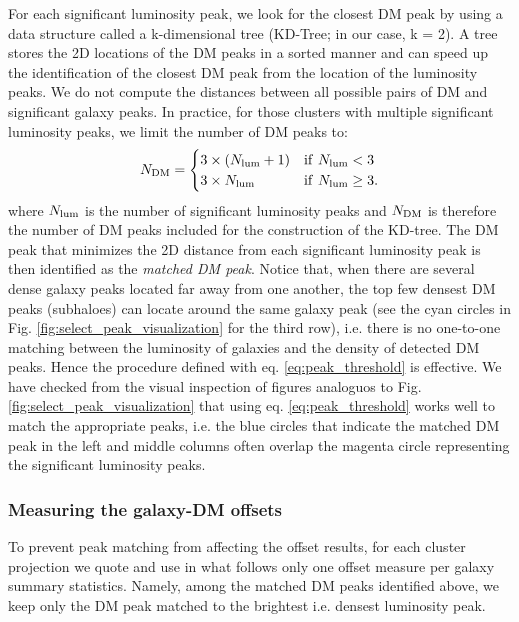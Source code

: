 \documentclass[usenatbib]{mn2e}
\begin{document}
{For each significant luminosity peak, we look for the closest DM peak by using a data structure called a k-dimensional tree (KD-Tree; in
our case, k = 2). A tree stores the 2D locations of the DM peaks in a sorted
manner and can speed up the identification of the closest DM peak from the
location of the luminosity peaks.
We do not compute the distances
between all possible pairs of DM and significant galaxy peaks. 
In practice, for those clusters with multiple significant luminosity peaks, we limit the number of DM peaks to:
\begin{equation}
	N_{\rm DM} = \begin{cases}		
		3 \times (N_{\rm lum} + 1) & {\rm if~} N_{\rm lum} < 3 \\
	3 \times N_{\rm lum}  & {\rm if~} N_{\rm lum} \geq 3.
	\end{cases}
	\label{eq:peak_threshold}
\end{equation}
where $N_{\rm lum}$ is the number of significant luminosity peaks and $N_{\rm DM}$
is therefore the number of DM peaks included for the construction of the KD-tree. The DM peak that minimizes the 2D distance from each significant luminosity peak is then identified as the {\it matched DM peak}.
Notice that, when there are several dense galaxy peaks located far away from one another, 
the top few densest DM peaks (subhaloes) can locate around the same galaxy
peak (see the cyan circles in Fig. \ref{fig:select_peak_visualization} for the
third row), i.e. there is no one-to-one matching between the luminosity of 
galaxies and the density of detected DM peaks. Hence the procedure defined with eq. \ref{eq:peak_threshold} is effective.
We have checked from the visual inspection of figures analoguos to
Fig. \ref{fig:select_peak_visualization} that using eq. \ref{eq:peak_threshold} works well to match the 
appropriate peaks, i.e. the blue circles that indicate the matched DM peak 
in the left and middle columns 
often overlap the magenta circle representing the significant luminosity peaks.  


\subsubsection{Measuring the galaxy-DM offsets}
To prevent peak matching from affecting the offset results, for each cluster projection we quote and use in what follows only one offset measure per galaxy summary statistics. Namely, among the matched DM peaks identified above, we keep only the DM peak matched to the brightest i.e. densest luminosity peak. 

}
\end{document}
